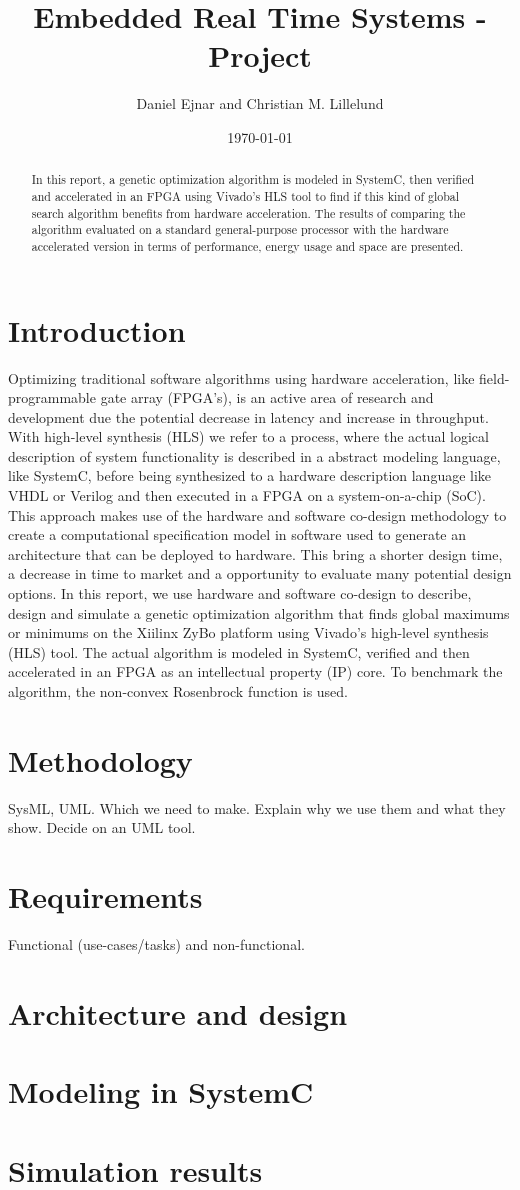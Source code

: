 \documentclass{article}
\title{Embedded Real Time Systems - Project}
\author{Daniel Ejnar and Christian M. Lillelund}
\date{\today}
\begin{document}
\maketitle
\begin{abstract}
	In this report, a genetic optimization algorithm is modeled in SystemC, then verified and accelerated in an FPGA using Vivado's HLS tool to find if this kind of global search algorithm benefits from hardware acceleration. The results of comparing the algorithm evaluated on a standard general-purpose processor with the hardware accelerated version in terms of performance, energy usage and space are presented.
\end{abstract}

\section{Introduction}
Optimizing traditional software algorithms using hardware acceleration, like field-programmable gate array (FPGA's), is an active area of research and development due the potential decrease in latency and increase in throughput. With high-level synthesis (HLS) we refer to a process, where the actual logical description of system functionality is described in a abstract modeling language, like SystemC, before being synthesized to a hardware description language like VHDL or Verilog and then executed in a FPGA on a system-on-a-chip (SoC). This approach makes use of the hardware and software co-design methodology to create a computational specification model in software used to generate an architecture that can be deployed to hardware. This bring a shorter design time, a decrease in time to market and a opportunity to evaluate many potential design options. In this report, we use hardware and software co-design to describe, design and simulate a genetic optimization algorithm that finds global maximums or minimums on the Xiilinx ZyBo platform using Vivado's high-level synthesis (HLS) tool. The actual algorithm is modeled in SystemC, verified and then accelerated in an FPGA as an intellectual property (IP) core. To benchmark the algorithm, the non-convex Rosenbrock function is used.

\section{Methodology}

SysML, UML. Which we need to make. Explain why we use them and what they show. Decide on an UML tool.
\section{Requirements}

Functional (use-cases/tasks) and non-functional.
\section{Architecture and design}
\section{Modeling in SystemC}
\section{Simulation results}

{}
\end{document}
